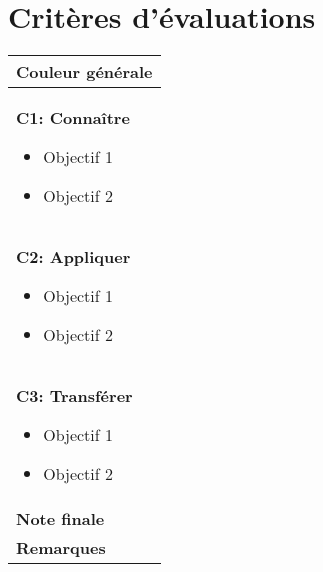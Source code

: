 \section*{Critères d'évaluations}


 
{ \small
\begin{spacing}{1.2}
	\begin{tabularx}{\textwidth}{|X|}
		\hline
		\large Couleur générale \\
		\hline
		\textbf{C1: Connaître}
		\begin{itemize}
		    \item Objectif 1
		    \item Objectif 2
		\end{itemize} \\
		\hline
		\textbf{C2: Appliquer}
		\begin{itemize}
		    \item Objectif 1
		    \item Objectif 2
		\end{itemize} \\
		\hline
		\textbf{C3: Transférer}
		\begin{itemize}
		    \item Objectif 1
		    \item Objectif 2
		\end{itemize} \\
		\hline
		    \parbox{\dimexpr\textwidth-2\tabcolsep\relax}{
		        \strut
		        \textbf{Note finale}
		        \vspace{1.2cm}
		        \strut 
		     } \\
		\hline
		    \parbox{\dimexpr\textwidth-2\tabcolsep\relax}{
		        \strut
		        \textbf{Remarques}
		        \vspace{1.5cm}
		        \strut
		 } \\
		\hline
	\end{tabularx}
\end{spacing}
}
